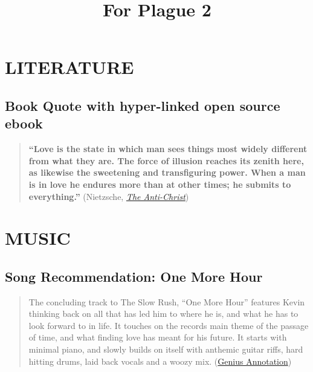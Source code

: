 \documentclass[
]{article}
\title{For Plague 2}
\author{}
\date{\vspace{-2.5em}}
\begin{document}
\maketitle

{
\setcounter{tocdepth}{4}
\tableofcontents
}
\section{LITERATURE}\label{literature}

\subsection{\texorpdfstring{\textbf{Book Quote} with hyper-linked open
source
ebook}{Book Quote with hyper-linked open source ebook}}\label{book-quote-with-hyper-linked-open-source-ebook}

\begin{quote}
\textbf{``Love is the state in which man sees things most widely
different from what they are. The force of illusion reaches its zenith
here, as likewise the sweetening and transfiguring power. When a man is
in love he endures more than at other times; he submits to
everything.''} (Nietzsche,
\href{https://www.gutenberg.org/files/19322/19322-h/19322-h.htm}{\emph{The
Anti-Christ}})
\end{quote}

\section{MUSIC}\label{music}

\subsection{\texorpdfstring{\textbf{Song Recommendation}: One More
Hour}{Song Recommendation: One More Hour}}\label{song-recommendation-one-more-hour}

\begin{quote}
The concluding track to The Slow Rush, ``One More Hour'' features Kevin
thinking back on all that has led him to where he is, and what he has to
look forward to in life. It touches on the records main theme of the
passage of time, and what finding love has meant for his future. It
starts with minimal piano, and slowly builds on itself with anthemic
guitar riffs, hard hitting drums, laid back vocals and a woozy mix.
(\href{https://genius.com/Tame-impala-one-more-hour-lyrics}{Genius
Annotation})
\end{quote}
\end{document}
